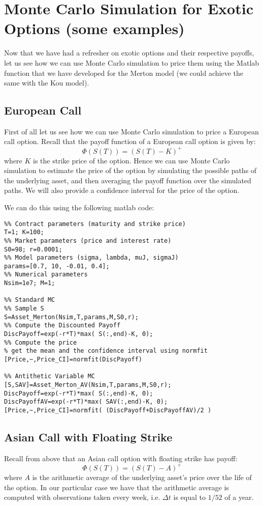 \section{Monte Carlo Simulation for Exotic Options (some examples)}
Now that we have had a refresher on exotic options and their respective payoffs,
let us see how we can use Monte Carlo simulation to price them using the Matlab
function that we have developed for the Merton model (we could achieve the same
with the Kou model).

\subsection{European Call}
First of all let us see how we can use Monte Carlo simulation to price a
European call option. Recall that the payoff function of a European call option
is given by:
\[ \Phi(S(T)) = (S(T) - K)^+ \]
where $K$ is the strike price of the option.
Hence we can use Monte Carlo simulation to estimate the price of the option by
simulating the possible paths of the underlying asset, and then averaging the
payoff function over the simulated paths. We will also provide a confidence
interval for the price of the option.

We can do this using the following matlab code:

\begin{verbatim}
%% Contract parameters (maturity and strike price)
T=1; K=100;
%% Market parameters (price and interest rate)
S0=98; r=0.0001;
%% Model parameters (sigma, lambda, muJ, sigmaJ)
params=[0.7, 10, -0.01, 0.4];
%% Numerical parameters
Nsim=1e7; M=1;

%% Standard MC
%% Sample S
S=Asset_Merton(Nsim,T,params,M,S0,r);
%% Compute the Discounted Payoff
DiscPayoff=exp(-r*T)*max( S(:,end)-K, 0);
%% Compute the price
% get the mean and the confidence interval using normfit
[Price,~,Price_CI]=normfit(DiscPayoff)

%% Antithetic Variable MC
[S,SAV]=Asset_Merton_AV(Nsim,T,params,M,S0,r);
DiscPayoff=exp(-r*T)*max( S(:,end)-K, 0);
DiscPayoffAV=exp(-r*T)*max( SAV(:,end)-K, 0);
[Price,~,Price_CI]=normfit( (DiscPayoff+DiscPayoffAV)/2 )

\end{verbatim}

\subsection{Asian Call with Floating Strike}
Recall from above that an Asian call option with floating strike has payoff:
\[ \Phi(S(T)) = (S(T) - A)^+ \]
where $A$ is the arithmetic average of the underlying asset's price over the
life of the option. In our particular case we have that the arithmetic average
is computed with observations taken every week, i.e. $\Delta t$ is equal to
$1/52$ of a year.

